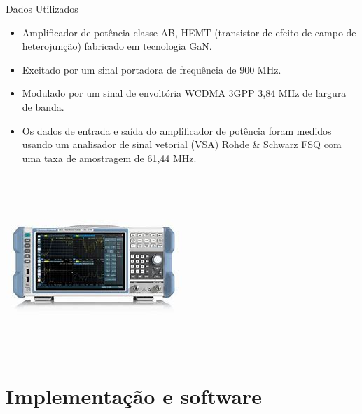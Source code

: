 \documentclass{if-beamer}
\begin{document}
\begin{frame}{Dados Utilizados}
	\begin{minipage}{0.5\textwidth}
		
		
	\end{minipage}%
	\hspace{0.04\textwidth}
	\begin{minipage}{0.5\textwidth}
		\begin{itemize}
			\item Amplificador de potência classe AB, HEMT (transistor de efeito de campo de heterojunção) fabricado em tecnologia GaN.
			\item Excitado por um sinal portadora de frequência de 900	MHz.
			\item Modulado por um sinal de envoltória WCDMA 3GPP 3,84 MHz de largura de banda.
			\item Os dados de entrada e saída do amplificador de potência foram medidos usando um analisador de sinal vetorial (VSA) Rohde \& Schwarz FSQ com uma taxa de amostragem de 61,44 MHz.
		\end{itemize}
	\end{minipage}
	\begin{minipage}{0.5\textwidth}
		\begin{center}
			\includegraphics[scale=0.4]{analisador.jpeg}
		\end{center}
	\end{minipage}%
\end{frame}

\section{Implementação e software}
\end{document}
